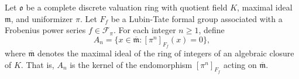 Let $\mathfrak{o}$ be a complete discrete valuation ring with quotient field $K$, maximal ideal $\mathfrak{m}$, and uniformizer $\pi$. Let $F_f$ be a Lubin-Tate formal group associated with a Frobenius power series $f \in \mathcal{F}_\pi$. For each integer $n \ge 1$, define
$$
A_n = \{ x \in \overline{\mathfrak{m}} : [\pi^n]_{F_f}(x) = 0 \},
$$
where $\overline{\mathfrak{m}}$ denotes the maximal ideal of the ring of integers of an algebraic closure of $K$. That is, $A_n$ is the kernel of the endomorphism $[\pi^n]_{F_f}$ acting on $\overline{\mathfrak{m}}$.
